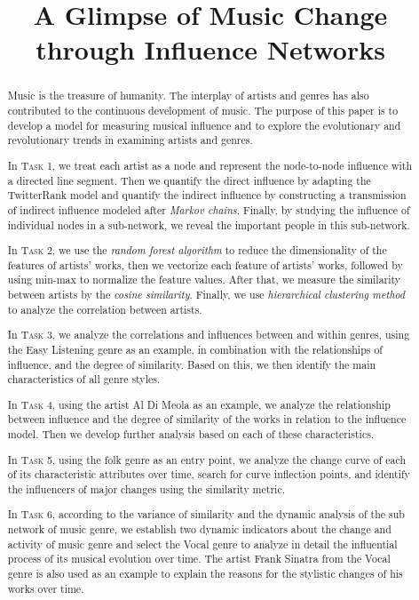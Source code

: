 \documentclass[12pt]{article}  %
\title{A Glimpse of Music Change through Influence Networks}  %
\begin{document}
\begin{abstract}
	
	Music is the treasure of humanity. The interplay of artists and genres has also contributed to the continuous development of music. The purpose of this paper is to develop a model for measuring musical influence and to explore the evolutionary and revolutionary trends in examining artists and genres.
	
	In \textsc{Task 1}, we treat each artist as a node and represent the node-to-node influence with a directed line segment. Then we quantify the direct influence by adapting the TwitterRank model and quantify the indirect influence by constructing a transmission of indirect influence modeled after \textit{Markov chains}. Finally, by studying the influence of individual nodes in a sub-network, we reveal the important people in this sub-network.
	
	In \textsc{Task 2}, we use the \textit{random forest algorithm} to reduce the dimensionality of the features of artists' works, then we vectorize each feature of artists' works, followed by using min-max to normalize the feature values. After that, we measure the similarity between artists by the \textit{cosine similarity}. Finally, we use \textit{hierarchical clustering method} to analyze the correlation between artists. 
	
	In \textsc{Task 3}, we analyze the correlations and influences between and within genres, using the Easy Listening genre as an example, in combination with the relationships of influence, and the degree of similarity. Based on this, we then identify the main characteristics of all genre styles.
	
	In \textsc{Task 4}, using the artist Al Di Meola as an example, we analyze the relationship between influence and the degree of similarity of the works in relation to the influence model. Then we develop further analysis based on each of these characteristics. 
	
	In \textsc{Task 5}, using the folk genre as an entry point, we analyze the change curve of each of its characteristic attributes over time, search for curve inflection points, and identify the influencers of major changes using the similarity metric.
	
	In \textsc{Task 6}, according to the variance of similarity and the dynamic analysis of the sub network of music genre, we establish two dynamic indicators about the change and activity of music genre and select the Vocal genre to analyze in detail the influential process of its musical evolution over time. The artist Frank Sinatra from the Vocal genre is also used as an example to explain the reasons for the stylistic changes of his works over time.
	

\end{abstract}
\end{document}
